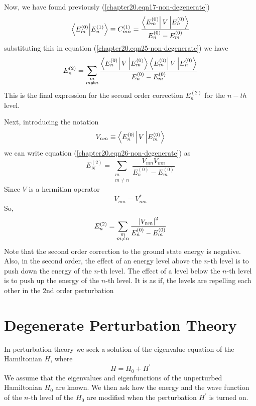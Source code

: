 	Now, we have found previously (\ref{chapter20.eqn17-non-degenerate}) 
	\begin{equation}
		\braket{E_m^{(0)}}{E_n^{(1)}} \equiv C^{(1)}_{m n} = \frac{\bra{E_m^{(0)}} V \ket{E_n^{(0)}}}{E_n^{(0)} - E_m^{(0)}}
	\end{equation}
	substituting this in equation (\ref{chapter20.eqn25-non-degenerate}) we have
	\begin{equation}
		E_n^{(2)} = \sum_{\substack{m\\ m \neq n}} \frac{\bra{E_n^{(0)}} V \ket{E_m^{(0)}}\bra{E_m^{(0)}} V \ket{E_n^{(0)}}}{E_n^{(0)} - E_m^{(0)}}
		\label{chapter20.eqn26-non-degenerate} 
	\end{equation}
	This is the final expression for the second order correction $E_n^{(2)}$ for the $n-th$ level.
	
	Next, introducing the notation
	\begin{equation}
		V_{n m} \equiv \bra{E_n^{(0)}} V \ket{E_m^{(0)}}
	\end{equation}
	we can write equation (\ref{chapter20.eqn26-non-degenerate}) as 
	\begin{equation}
		E_N^{(2)} = \sum_{\substack{m\\ m \neq n}} \frac{V_{n m} V_{m n}}{E_n^{(0)} - E_m^{(0)}}
	\end{equation}
	Since $V$ is a hermitian operator
	\begin{equation}
		V_{m n} = V_{n m}^*
	\end{equation}
	So,
	\begin{equation}
		E_n^{(2)} = \sum_{\substack{m\\ m \neq n}} \frac{\abs{V_{nm}}^2}{E_n^{(0)} - E_m^{(0)}}
		\label{chapter20.eqn27-non-degenerate} 
	\end{equation}
	Note that the second order correction to the ground state energy is negative. Also, in the second order, the effect of an energy level above the $n$-th level is to push down the energy of the $n$-th level. The effect of a level below the $n$-th level is to push up the energy of the $n$-th level. It is as if, the levels are repelling each other in the $2$nd order perturbation

\section{Degenerate Perturbation Theory}
	In perturbation theory we seek a solution of the eigenvalue equation of the Hamiltonian $H$, where
	\begin{equation}
		H = H_0 + H^\prime
		\label{chapter20.eqn1-degenerate} 
	\end{equation}
	We assume that the eigenvalues and eigenfunctions of the unperturbed Hamiltonian $H_0$ are known. We then ask how the energy and the wave function of the $n$-th level of the $H_0$ are modified when the perturbation $H^\prime$ is turned on.
	
